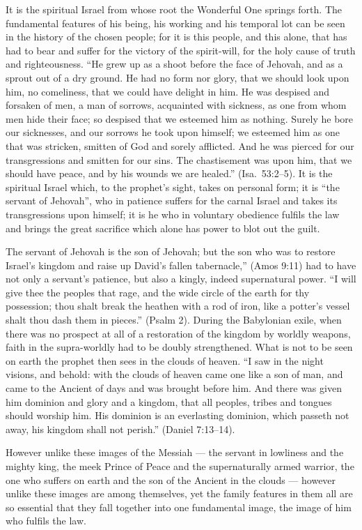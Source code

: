 \documentclass[12pt,a4paper,openany]{book}
\newcommand{\opage}[1]{\marginnote{\footnotesize\textit{[#1]}}}
\begin{document}
It is the spiritual Israel from whose root the Wonderful One
springs forth. The fundamental features of his being,
his working and his temporal lot can be seen in the history of the chosen
people; for it is this people, and this
alone, that has had to bear and suffer for the victory of the spirit-will,
for the holy cause of truth and righteousness.
``He grew up as a shoot before the face of Jehovah, and
as a sprout out of a dry ground. He had no
form nor glory, that we should look upon him,
no comeliness, that we could have delight in him. He
was despised and forsaken of men, a man of
sorrows, acquainted with sickness, as one from whom men
hide their face; so despised that we esteemed him as
nothing. Surely he bore our sicknesses, and our
\setcounter{footnote}{0}%
\opage{55}sorrows he took upon himself; we esteemed him as one
that was stricken, smitten of God and sorely afflicted. And
he was pierced for our transgressions
and smitten for our sins. The chastisement was upon him, that
we should have peace, and by his wounds we are healed.''
(Isa.~53:2--5). It is the spiritual Israel which,
to the prophet's sight, takes on personal form; it
is ``the servant of Jehovah'', who in patience suffers for the
carnal Israel and takes its transgressions upon himself;
it is he who in voluntary obedience fulfils the law
and brings the great sacrifice which alone has power to blot out
the guilt.

The servant of Jehovah is the son of Jehovah; but the son who
was to restore Israel's kingdom and raise up David's fallen
tabernacle,'' (Amos 9:11) had to have not only a servant's
patience, but also a kingly, indeed supernatural power.
``I will give thee the peoples that rage, and the wide
circle of the earth for thy possession; thou shalt break the heathen with
a rod of iron, like a potter's vessel shalt thou dash them in
pieces.'' (Psalm 2). During the Babylonian exile,
when there was no prospect at all of a restoration
of the kingdom by worldly weapons, faith
in the supra-worldly had to be doubly strengthened. What is
not to be seen on earth the prophet then sees in the clouds
of heaven. ``I saw in the night visions, and behold: with
the clouds of heaven came one like a son of man, and
came to the Ancient of days and was brought before
him. And there was given him dominion and glory and a kingdom, that
all peoples, tribes and tongues should worship him.
His dominion is an everlasting dominion, which
passeth not away, his kingdom shall not perish.''
(Daniel 7:13--14).

\setcounter{footnote}{0}%
\opage{56}However unlike these images of the Messiah --- the servant in
lowliness and the mighty king, the meek Prince
of Peace and the supernaturally armed warrior, the
one who suffers on earth and the son of the Ancient in the clouds
--- however unlike these images are among themselves, yet
the family features in them all are so essential that they
fall together into one fundamental image, the image of him who
fulfils the law.
\end{document}
